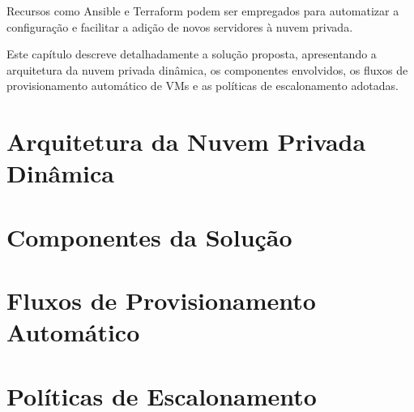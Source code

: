 Recursos como Ansible e Terraform podem ser empregados para automatizar a configuração e facilitar a adição de novos servidores à nuvem privada.


Este capítulo descreve detalhadamente a solução proposta, apresentando a arquitetura da nuvem privada dinâmica, os componentes envolvidos, os fluxos de provisionamento automático de VMs e as políticas de escalonamento adotadas.

\section{Arquitetura da Nuvem Privada Dinâmica}

\section{Componentes da Solução}

\section{Fluxos de Provisionamento Automático}

\section{Políticas de Escalonamento}
